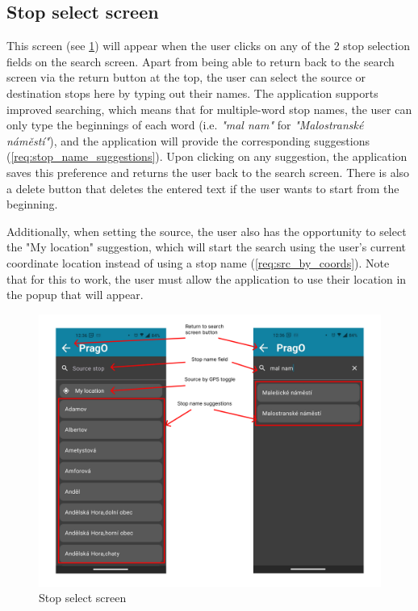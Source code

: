\newpage

\subsection{Stop select screen}

This screen (see \cref{fig:stop_select}) will appear when the user clicks on any of the 2 stop selection fields on the search screen. Apart from being able to return back to the search screen via the return button at the top, the user can select the source or destination stops here by typing out their names. The application supports improved searching, which means that for multiple-word stop names, the user can only type the beginnings of each word (i.e. \textit{"mal nam"} for \textit{"Malostranské náměstí"}), and the application will provide the corresponding suggestions (\cref{req:stop_name_suggestions}). Upon clicking on any suggestion, the application saves this preference and returns the user back to the search screen. There is also a delete button that deletes the entered text if the user wants to start from the beginning.

Additionally, when setting the source, the user also has the opportunity to select the "My location" suggestion, which will start the search using the user's current coordinate location instead of using a stop name (\cref{req:src_by_coords}). Note that for this to work, the user must allow the application to use their location in the popup that will appear.

\begin{figure}[h!]
    \centering
    \includegraphics[width=\textwidth]{img/ui_descriptions/stop_search_screen.pdf}
    \caption{Stop select screen}
    \label{fig:stop_select}
\end{figure}

